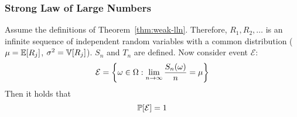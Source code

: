 \subsubsection{Strong Law of Large Numbers}
\label{sec:bp-strong-law}
%
\begin{theorem}\label{thm:slln}
  Assume the definitions of Theorem~\ref{thm:weak-lln}.
  Therefore, $R_1, R_2, \ldots$ is an infinite sequence of independent random variables
  with a common distribution ($\mu = \mathbb E[R_j]$, $\sigma^2 = \mathbb V[R_j]$). $S_n$ and $T_n$
  are defined. Now consider event $\mathcal E$:
  \[
    \mathcal E = \left\{
      \omega \in \Omega: \lim_{n\to\infty} \frac{S_n(\omega)}{n} = \mu
    \right\}
  \]
  Then it holds that
  \[ \mathbb P[\mathcal E] = 1 \]
\end{theorem}

